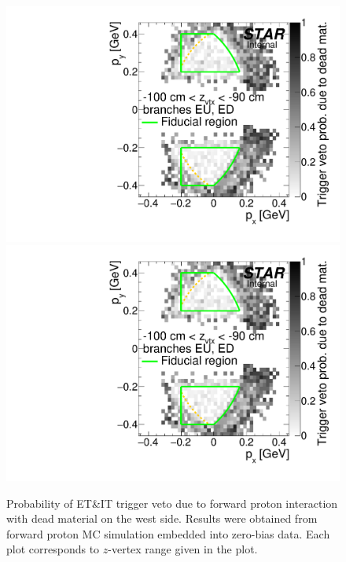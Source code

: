 \begin{figure}[hb]
\caption[Probability of ET\&IT trigger veto due to forward proton interaction with dead material on the west.]{Probability of ET\&IT trigger veto due to forward proton interaction with dead material on the west side. Results were obtained from forward proton MC simulation embedded into zero-bias data. Each plot corresponds to $z$-vertex range given in the plot.}\label{fig:rpDeadMatProbW} 
\centering
\parbox{0.495\textwidth}{
  \centering
  \includegraphics[width=\linewidth,page=23]{graphics/corrections/mcDeadMatProbPxPy.pdf}\\
  \includegraphics[width=\linewidth,page=25]{graphics/corrections/mcDeadMatProbPxPy.pdf}\\
}
\end{figure}
